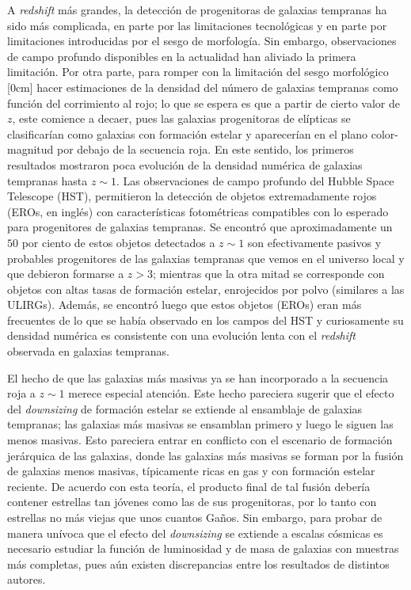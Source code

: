 \documentclass[a4paper,twoside]{article}
\begin{document}
A \emph{redshift} más grandes, la detección de progenitoras de galaxias tempranas ha sido más complicada, en parte por las limitaciones tecnológicas y en parte por limitaciones introducidas por el sesgo de morfología. Sin embargo, observaciones de campo profundo disponibles en la actualidad han aliviado la primera limitación. Por otra parte, para romper con la limitación del sesgo morfológico [0cm] hacer estimaciones de la densidad del número de galaxias tempranas como función del corrimiento al rojo; lo que se espera es que a partir de cierto valor de $z$, este comience a decaer, pues las galaxias progenitoras de elípticas se clasificarían como galaxias con formación estelar y aparecerían en el plano color-magnitud por debajo de la secuencia roja. En este sentido, los primeros resultados mostraron poca evolución de la densidad numérica de galaxias tempranas hasta $z\sim1$. Las observaciones de campo profundo del Hubble Space Telescope (HST), permitieron la detección de objetos extremadamente rojos (EROs, en inglés) con características fotométricas compatibles con lo esperado para progenitores de galaxias tempranas. Se encontró que aproximadamente un $50$ por ciento de estos objetos detectados a $z\sim1$ son efectivamente pasivos y probables progenitores de las galaxias tempranas que vemos en el universo local y que debieron formarse a $z>3$; mientras que la otra mitad se corresponde con objetos con altas tasas de formación estelar, enrojecidos por polvo (similares a las ULIRGs). Además, se encontró luego que estos objetos (EROs) eran más frecuentes de lo que se había observado en los campos del HST y curiosamente su densidad numérica es consistente con una evolución lenta con el \emph{redshift} observada en galaxias tempranas.

El hecho de que las galaxias más masivas ya se han incorporado a la secuencia roja a $z\sim1$ merece especial atención. Este hecho pareciera sugerir que el efecto del \emph{downsizing} de formación estelar se extiende al ensamblaje de galaxias tempranas; las galaxias más masivas se ensamblan primero y luego le siguen las menos masivas. Esto pareciera entrar en conflicto con el escenario de formación jerárquica de las galaxias, donde las galaxias más masivas se forman por la fusión de galaxias menos masivas, típicamente ricas en gas y con formación estelar reciente. De acuerdo con esta teoría, el producto final de tal fusión debería contener estrellas tan jóvenes como las de sus progenitoras, por lo tanto con estrellas no más viejas que unos cuantos Gaños. Sin embargo, para probar de manera unívoca que el efecto del \emph{downsizing} se extiende a escalas cósmicas es necesario estudiar la función de luminosidad y de masa de galaxias con muestras más completas, pues aún existen discrepancias entre los resultados de distintos autores.
\end{document}
